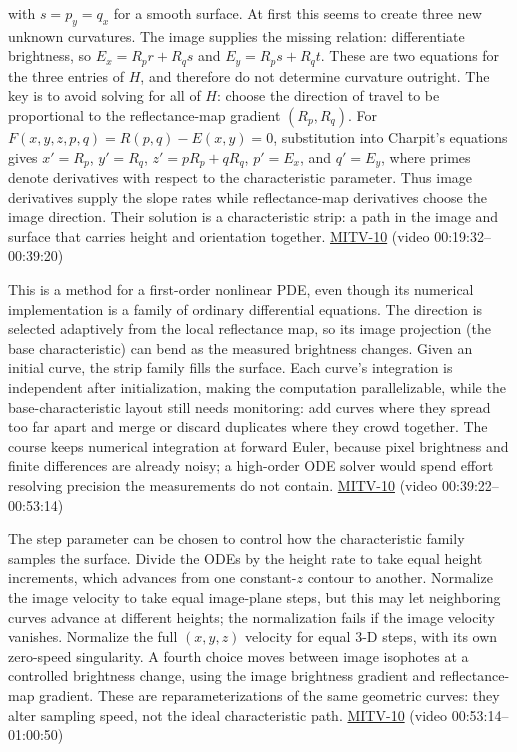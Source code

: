 with \(s=p_y=q_x\) for a smooth surface. At first this seems to create three new unknown curvatures. The image supplies the missing relation: differentiate brightness, so \(E_x=R_p r+R_qs\) and \(E_y=R_ps+R_qt\). These are two equations for the three entries of \(H\), and therefore do not determine curvature outright. The key is to avoid solving for all of \(H\): choose the direction of travel to be proportional to the reflectance-map gradient \((R_p,R_q)\). For \(F(x,y,z,p,q)=R(p,q)-E(x,y)=0\), substitution into Charpit's equations gives \(x'=R_p\), \(y'=R_q\), \(z'=pR_p+qR_q\), \(p'=E_x\), and \(q'=E_y\), where primes denote derivatives with respect to the characteristic parameter. Thus image derivatives supply the slope rates while reflectance-map derivatives choose the image direction. Their solution is a characteristic strip: a path in the image and surface that carries height and orientation together. \hyperref[04-visual-computing-ii-ch036-mitv-10---characteristic-strip-expansion-shape-from-shading-iterative-solutions]{MITV-10} (video 00:19:32--00:39:20)

This is a method for a first-order nonlinear PDE, even though its numerical implementation is a family of ordinary differential equations. The direction is selected adaptively from the local reflectance map, so its image projection (the base characteristic) can bend as the measured brightness changes. Given an initial curve, the strip family fills the surface. Each curve's integration is independent after initialization, making the computation parallelizable, while the base-characteristic layout still needs monitoring: add curves where they spread too far apart and merge or discard duplicates where they crowd together. The course keeps numerical integration at forward Euler, because pixel brightness and finite differences are already noisy; a high-order ODE solver would spend effort resolving precision the measurements do not contain. \hyperref[04-visual-computing-ii-ch036-mitv-10---characteristic-strip-expansion-shape-from-shading-iterative-solutions]{MITV-10} (video 00:39:22--00:53:14)

The step parameter can be chosen to control how the characteristic family samples the surface. Divide the ODEs by the height rate to take equal height increments, which advances from one constant-\(z\) contour to another. Normalize the image velocity to take equal image-plane steps, but this may let neighboring curves advance at different heights; the normalization fails if the image velocity vanishes. Normalize the full \((x,y,z)\) velocity for equal 3-D steps, with its own zero-speed singularity. A fourth choice moves between image isophotes at a controlled brightness change, using the image brightness gradient and reflectance-map gradient. These are reparameterizations of the same geometric curves: they alter sampling speed, not the ideal characteristic path. \hyperref[04-visual-computing-ii-ch036-mitv-10---characteristic-strip-expansion-shape-from-shading-iterative-solutions]{MITV-10} (video 00:53:14--01:00:50)

